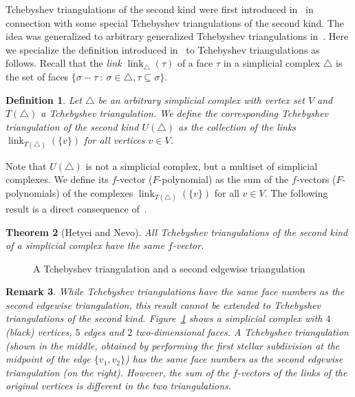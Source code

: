 \documentclass[reqno,12pt]{amsart}
\numberwithin{equation}{section}
\newtheorem{theorem}{Theorem}[section]
\newtheorem{definition}[theorem]{Definition}
\newtheorem{remark}[theorem]{Remark}
\DeclareMathOperator{\link}{link}
\newcommand{\0}{\widehat{0}}
\newcommand{\1}{\widehat{1}}
\newcommand{\2}{\widehat{2}}
\begin{document}
Tchebyshev triangulations of the second kind were first introduced
in~\cite{Hetyei-tt} in connection with some special Tchebyshev
triangulations of the second kind. The idea was generalized to arbitrary
generalized Tchebyshev triangulations in~\cite{Hetyei-Nevo}. Here we
specialize the definition introduced in~\cite{Hetyei-Nevo} to Tchebyshev
triangulations as follows. Recall that the {\em link
  $\link_{\triangle}(\tau)$} of a 
face $\tau$ in a simplicial complex $\triangle$ is the set of faces
$\{\sigma-\tau\: : \: \sigma\in \triangle, \tau\subseteq \sigma\}$. 
\begin{definition}
Let $\triangle$ be an arbitrary simplicial complex with vertex set $V$
and $T(\triangle)$ a Tchebyshev triangulation. We define the {\em
  corresponding Tchebyshev triangulation of the second kind
  $U(\triangle)$} as the collection of the links
$\link_{T(\triangle)}(\{v\})$ for all vertices $v\in V$.
\end{definition}  
Note that $U(\triangle)$ is not a simplicial complex, but a multiset of
simplicial complexes. We define its $f$-vector ($F$-polynomial) as the
sum of the $f$-vectors ($F$-polynomials) of the complexes
$\link_{T(\triangle)}(\{v\})$ for all $v\in V$. The following result is
a direct consequence of~\cite[Theorem 3.3]{Hetyei-Nevo}. 
\begin{theorem}[Hetyei and Nevo]
\label{thm:Hetyei-Nevo2}  
All Tchebyshev triangulations of the second kind of a simplicial complex
have the same $f$-vector. 
\end{theorem}
\begin{figure}[h]
\caption{A Tchebyshev triangulation and a second edgewise triangulation}  
\label{fig:triangulations}
\end{figure}  
\begin{remark}
{\em While Tchebyshev triangulations have the same face numbers as the
  second edgewise triangulation, this result cannot be extended to
  Tchebyshev triangulations of the second
  kind. Figure~\ref{fig:triangulations} shows a simplicial complex with
  $4$ (black) vertices, $5$ edges and $2$ two-dimensional faces. A
  Tchebyshev triangulation (shown in the middle, obtained by performing
  the first stellar subdivision at the midpoint of the edge
  $\{v_1,v_2\}$) has the same face   numbers as the second edgewise
  triangulation (on the right). However, the sum of the $f$-vectors of the
  links of the original vertices is different in the two triangulations.
}
\label{rem:second}
\end{remark}  
\end{document}
